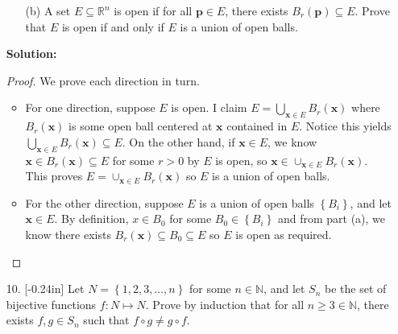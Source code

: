 \documentclass[letterpaper,12pt]{article}
\newcommand{\set}[1]{\left\{ #1 \right\}}
\theoremstyle{definition}
\begin{document}
\begin{enumerate}
    \item[] \begin{enumerate}
        \item[(b)] A set $E \subseteq \mathbb{R}^n$ is open if for all $\mathbf{p} \in E$, there exists $B_r(\mathbf{p}) \subseteq E$. Prove that $E$ is open if and only if $E$ is a union of open balls.
    \end{enumerate}
      \begin{mdframed}
            \textbf{Solution:}
            \begin{proof}
               We prove each direction in turn. \begin{itemize}
                    \item For one direction, suppose $E$ is open. I claim $E = \bigcup_{\mathbf{x} \in E} B_r(\mathbf{x})$ where $B_r(\mathbf{x})$ is some open ball centered at $\mathbf{x}$ contained in $E$. Notice this yields $\bigcup_{\mathbf{x} \in E} B_r(\mathbf{x}) \subseteq E$. On the other hand, if $\mathbf{x} \in E$, we know $\mathbf{x} \in B_r(\mathbf{x}) \subseteq E$ for some $r > 0$ by $E$ is open, so $\mathbf{x} \in \cup_{\mathbf{x} \in E} B_r(\mathbf{x})$. This proves $E = \cup_{\mathbf{x} \in E} B_r(\mathbf{x})$ so $E$ is a union of open balls.
                    \item For the other direction, suppose $E$ is a union of open balls $\set{B_i}$, and let $\mathbf{x} \in E$. By definition, $x \in {B}_0$ for some ${B}_0 \in \set{B_i}$ and from part (a), we know there exists $B_r(\mathbf{x}) \subseteq {B}_0 \subseteq E$ so $E$ is open as required.
                \end{itemize}
            \end{proof}
        \end{mdframed}
\end{enumerate}
\pagebreak
\begin{enumerate}
    \item[10.] \reversemarginpar{}[-0.24in] 
Let $N= \set{1,2,3,\ldots,n}$ for some $n \in \mathbb{N}$, and let $S_n$ be the set of bijective functions $f: N \mapsto N$. Prove by induction that for all $n \geq 3 \in \mathbb{N}$, there exists $f,g \in S_n$ such that $f \circ g \neq g \circ f$.
   \end{enumerate}
\end{document}
